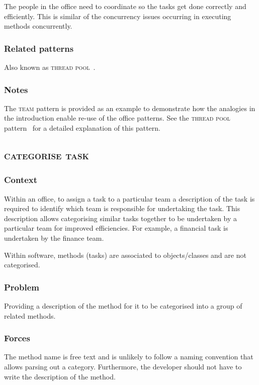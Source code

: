 \documentclass[prodmode]{style/acmlarge}
\begin{document}
The people in the office need to coordinate so the tasks get done correctly and
efficiently.  This is similar of the concurrency issues occurring in executing
methods concurrently.

\subsubsection*{Related patterns} Also known as \textsc{thread pool}~\cite{thread-per-request}.

\subsubsection*{Notes} The \textsc{team} pattern is provided as an example to
demonstrate how the analogies in the introduction enable re-use of the office
patterns. See the \textsc{thread pool} pattern~\cite{thread-per-request} for a
detailed explanation of this pattern.



\subsection{\textsc{\textbf{categorise task}}}

\subsubsection*{Context} Within an office, to assign a task to a particular team
a description of the task is required to identify which team is responsible for
undertaking the task.  This description allows categorising similar tasks
together to be undertaken by a particular team for improved efficiencies.  For
example, a financial task is undertaken by the finance team.

Within software, methods (tasks) are associated to objects/classes and are not
categorised.

\subsubsection*{\textbf{Problem}} Providing a description of the method for it to be
categorised into a group of related methods.

\subsubsection*{Forces} The method name is free text and is unlikely to follow a
naming convention that allows parsing out a category.  Furthermore, the
developer should not have to write the description of the method.
\end{document}
